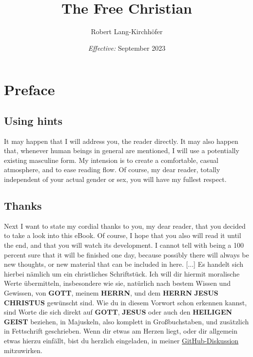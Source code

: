\documentclass[12pt,a4paper]{article}
\title{\textbf{The Free Christian}}
\author{Robert Lang-Kirchh\"ofer}
\date{\textit{Effective:} September 2023}
\newcommand{\Christus}[0]{\textbf{CHRISTUS}}
\newcommand{\Geist}[0]{\textbf{GEIST}}
\newcommand{\Gott}[0]{\textbf{GOTT}}
\newcommand{\Heiligen}[0]{\textbf{HEILIGEN}}
\newcommand{\Herrn}[0]{\textbf{HERRN}}
\newcommand{\Jesus}[0]{\textbf{JESUS}}
\begin{document}
	\setlength{\parindent}{0mm}
	\maketitle
	\newpage

	\tableofcontents
	\newpage
	
	\section{Preface}

	\subsection{Using hints}
		It may happen that I will address you,
		the reader directly.
		It may also happen that,
		whenever human beings in general are mentioned,
		I will use a potentially existing masculine form.
		My intension is to create a comfortable,
		casual atmosphere,
		and to ease reading flow.
		Of course,
		my dear reader,
		totally independent of your actual gender or sex,
		you will have my fullest respect.
		
	\subsection{Thanks}
		Next I want to state my cordial thanks to you,
		my dear reader,
		that you decided to take a look into this eBook.
		Of course,
		I hope that you also will read it until the end,
		and that you will watch its development.
		I cannot tell with being a 100 percent sure that it will be finished one day,
		because possibly there will always be new thoughts,
		or new material that can be included in here.
		[...]			
		Es handelt sich hierbei n\"amlich um ein christliches Schriftst\"uck.
		Ich will dir hiermit moralische Werte \"ubermitteln,
		insbesondere wie sie,
		nat\"urlich nach bestem Wissen und Gewissen,
		von {\Gott},
		meinem {\Herrn},
		und dem {\Herrn} {\Jesus} {\Christus} gew\"unscht sind.
		Wie du in diesem Vorwort schon erkennen kannst,
		sind Worte die sich direkt auf {\Gott},
		{\Jesus} oder auch den {\Heiligen} {\Geist} beziehen,
		in Majuskeln,
		also komplett in Gro{\ss}buchstaben,
		und zus\"atzlich in Fettschrift geschrieben.
		Wenn dir etwas am Herzen liegt,
		oder dir allgemein etwas hierzu einf\"allt,
		bist du herzlich eingeladen,
		in meiner \href{https://github.com/DerRobert-28/Der-Freie-Christ/discussions}{GitHub-Diskussion} mitzuwirken.
	
\end{document}
